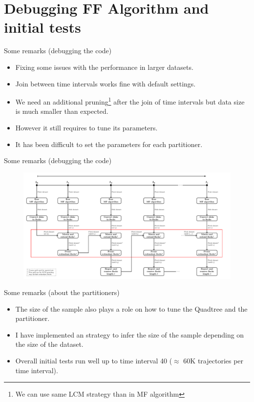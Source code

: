 \documentclass{beamer}
\begin{document}
\section{Debugging FF Algorithm and initial tests}

\begin{frame}{Some remarks (debugging the code)}
    \begin{itemize}
        \item Fixing some issues with the performance in larger datasets.
        \item Join between time intervals works fine with default settings.
        \item We need an additional pruning\footnote{\tiny We can use same LCM strategy than in MF algorithm} after the join of time intervals but data size is much smaller than expected. 
        \item However it still requires to tune its parameters.
        \item It has been difficult to set the parameters for each partitioner.
    \end{itemize}
\end{frame}

\begin{frame}{Some remarks (debugging the code)}
    \centering
    \begin{figure}
        \includegraphics[width=1\textwidth]{figures/FF_flowchart} \\
    \end{figure}
\end{frame}

\begin{frame}{Some remarks (about the partitioners)}
    \begin{itemize}
        \item The size of the sample also plays a role on how to tune the Quadtree and the partitioner.
        \item I have implemented an strategy to infer the size of the sample depending on the size of the dataset.
        \item Overall initial tests run well up to time interval 40 ($\approx$ 60K trajectories per time interval).
    \end{itemize}
\end{frame}
\end{document}

